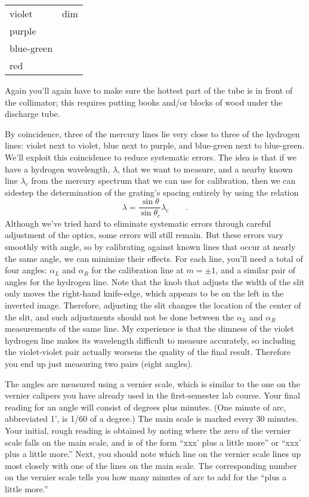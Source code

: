 \begin{tabular}{lp{50mm}}
  violet & dim \\
  purple & \\
  blue-green & \\
  red
\end{tabular}

Again you'll again have to make
sure the hottest part of the tube is in front of the
collimator; this requires putting
books and/or blocks of wood under the discharge tube.

By coincidence, three of the mercury lines lie very close to three of the hydrogen lines:
violet next to violet, blue next to purple, and blue-green next to blue-green.
We'll exploit this coincidence to reduce systematic errors.
The idea is that if we have a hydrogen wavelength, $\lambda$, that we want to measure,
and a nearby known line $\lambda_c$ from the mercury spectrum that we can use for calibration,
then we can sidestep the determination of the grating's spacing entirely by using the relation
\begin{equation*}
  \lambda = \frac{\sin\theta}{\sin\theta_c} \lambda_c \qquad .
\end{equation*}
Although we've tried hard to eliminate systematic errors through careful adjustment of the optics,
some errors will still remain. But these errors vary smooth\-ly with angle, so by calibrating against
known lines that occur at nearly the same angle, we can minimize their effects.
For each line, you'll need a total of four angles: $\alpha_L$ and $\alpha_R$ for the 
calibration line at $m=\pm1$, and a similar pair of angles for the hydrogen line.
Note that the knob that adjusts the width of the slit only moves the right-hand
knife-edge, which appears to be on the left in the inverted image. 
Therefore, adjusting the slit changes the location of the center of the slit,
and such adjustments should not be done between the $\alpha_L$ and $\alpha_R$ measurements
of the same line. My experience is that the dimness of the violet hydrogen line makes its
wavelength difficult to measure accurately, so including the violet-violet pair actually
worsens the quality of the final result. Therefore you end up just measuring two pairs
(eight angles).

The angles are measured using a vernier scale, which
is similar to the one on the vernier calipers you have
already used in the first-semester lab course. Your final
reading for an angle will consist of degrees plus minutes.
(One minute of arc, abbreviated 1', is 1/60 of a degree.)
The main scale is marked every 30 minutes. Your initial,
rough reading is obtained by noting where the zero of the
vernier scale falls on the main scale, and is of the form
``xxx' plus a little more'' or ``xxx'
plus a little more.'' Next, you should note which line on
the vernier scale lines up most closely with one of the
lines on the main scale. The corresponding number on the
vernier scale tells you how many minutes of arc to add for
the ``plus a little more.''

